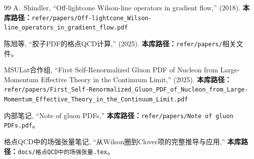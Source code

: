 \documentclass[12pt,a4paper]{ctexart}
\theoremstyle{definition}
\begin{document}
\begin{thebibliography}{99}
A.~Shindler,
``Off-lightcone Wilson-line operators in gradient flow,''
(2018).
\textbf{本库路径：}\texttt{refer/papers/Off-lightcone\_Wilson-line\_operators\_in\_gradient\_flow.pdf}

陈旭等,
``胶子PDF的格点QCD计算,''
(2025).
\textbf{本库路径：}\texttt{refer/papers/}相关文件。

MSULat合作组,
``First Self-Renormalized Gluon PDF of Nucleon from Large-Momentum Effective Theory in the Continuum Limit,''
(2025).
\textbf{本库路径：}\texttt{refer/papers/First\_Self-Renormalized\_Gluon\_PDF\_of\_Nucleon\_from\_Large-Momentum\_Effective\_Theory\_in\_the\_Continuum\_Limit.pdf}

内部笔记,
``Note of gluon PDFs,''
\textbf{本库路径：}\texttt{refer/papers/Note of gluon PDFs.pdf}。

格点QCD中的场强张量笔记,
``从Wilson圈到Clover项的完整推导与应用,''
\textbf{本库路径：}\texttt{docs/格点QCD中的场强张量.tex}。

\end{thebibliography}
\end{document}
